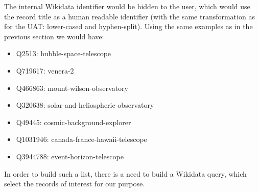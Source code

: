 \documentclass[11pt,a4paper]{ivoa}
\begin{document}
The internal Wikidata identifier would be hidden to the user, which 
would use the record title as a human readable identifier (with the 
same transformation as for the UAT: lower-cased and hyphen-split). 
Using the same examples as in the previous section we would have: 
\begin{itemize}
\item Q2513: hubble-space-telescope
\item Q719617: venera-2
\item Q466863: mount-wilson-observatory
\item Q320638: solar-and-heliospheric-observatory
\item Q49445: cosmic-background-explorer
\item Q1031946: canada-france-hawaii-telescope
\item Q3944788: event-horizon-telescope
\end{itemize}
In order to build such a list, there is a need to build a Wikidata 
query, which select the records of interest for our purpose.
\end{document}
